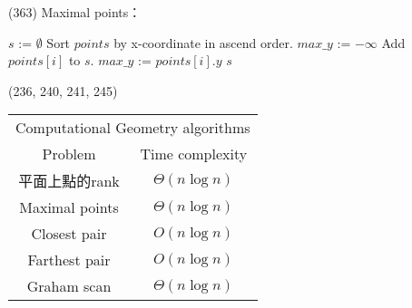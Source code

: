 \item \begin{theorem}{(363)} Maximal points：
    \begin{algorithm}[H]
        \begin{algorithmic}[1]
                \State $s$ := $\emptyset$
                \State Sort $points$ by x-coordinate in ascend order.
                \State $max\_y$ := $-\infty$
                        \State Add $points[i]$ to $s$.
                        \State $max\_y$ := $points[i].y$
                    \EndIf
                \EndFor
                \State \Return $s$
            \EndFunction
        \end{algorithmic}
    \end{algorithm}
\end{theorem}

\item \begin{theorem}{(236, 240, 241, 245)} \quad\quad
    \begin{table}[H]
        \centering
        \begin{tabular}{|c|c|}
            \hline
            \multicolumn{2}{|c|}{Computational Geometry algorithms} \\
            \Xhline{3\arrayrulewidth}
            Problem & Time complexity \\
            \Xhline{2\arrayrulewidth}
            平面上點的rank & $\Theta(n\log n)$ \\
            \hline
            Maximal points & $\Theta(n\log n)$ \\
            \hline
            Closest pair & $O(n\log n)$ \\
            \hline
            Farthest pair & $O(n\log n)$ \\
            \hline
            Graham scan & $\Theta(n\log n)$ \\
            \hline
        \end{tabular}
    \end{table}
\end{theorem}
